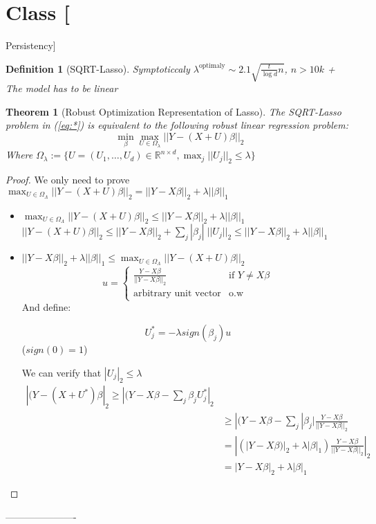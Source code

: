 \documentclass{article}
\newtheorem{theorem}{Theorem}
\newtheorem{definition}{Definition}
\newenvironment{class}[1]
{\section*{Class #1}}
{ ----------------------}
\begin{document}
\begin{class}{3}[Persistency]
\begin{definition}[SQRT-Lasso]
    Symptoticcaly $\lambda^{\text{optimaly}} \sim 2.1 \sqrt{\frac t{\log d}{n}}$, $n > 10k$ + The model has to be linear 
  \end{definition}
  \begin{theorem}[Robust Optimization Representation of Lasso]
    The SQRT-Lasso problem in (\ref{eq:*}) is equivalent to the following robust linear regression problem:
    $$\min_{\beta} \max_{U \in \Omega_{\lambda}} ||Y - (X + U)\beta||_2$$
    Where $\Omega_{\lambda} := \{ U = (U_1, \ldots, U_d)\in \mathbb R^{n \times d}, \max_j ||U_j||_2 \le \lambda \}$
  \end{theorem}
  \begin{proof}
    We only need to prove
    $\max_{U \in \Omega_{\Lambda}} ||Y - (X+U)\beta||_2 = ||Y - X\beta||_2 + \lambda ||\beta||_1$
    \begin{itemize}
    \item     $\max_{U \in \Omega_{\Lambda}} ||Y - (X+U)\beta||_2 \le ||Y - X\beta||_2 + \lambda ||\beta||_1$
      $||Y - (X+U)\beta||_2 \le ||Y - X\beta||_2 + \sum_j  |\beta_j| \; ||U_j||_2 \le ||Y - X\beta||_2 + \lambda ||\beta||_1$
    \item     $||Y - X\beta||_2 + \lambda ||\beta||_1 \le \max_{U \in \Omega_{\Lambda}} ||Y - (X+U)\beta||_2$
      \[
        u = \left\{
          \begin{array}{cc}
            \frac{Y - X\beta}{||Y-X\beta||_2} &\text{if } Y \ne X\beta\\
            \text{arbitrary unit vector}&\text{o.w}
          \end{array}
        \right.
      \]
      And define:
      
      $$U^*_j = -\lambda sign(\beta_j) u$$
      ($sign(0) = 1$)
      
      We can verify that $|U_j|_2 \le \lambda$
      \begin{align*}
        |(Y - (X+U^*)\beta|_2 \ge |(Y - X\beta - \sum_j \beta_jU^*_j|_2\\
        &\ge |(Y - X\beta - \sum_j |\beta_j| \frac{Y - X\beta}{||Y-X\beta||_2}\\
        &= | (|Y - X\beta)|_2 + \lambda |\beta|_1) \frac{Y - X\beta}{||Y-X\beta||_2} |_2\\
        &= |Y - X\beta|_2 + \lambda |\beta|_1
      \end{align*}


    \end{itemize}
    
  \end{proof}


\end{class}
\end{document}
